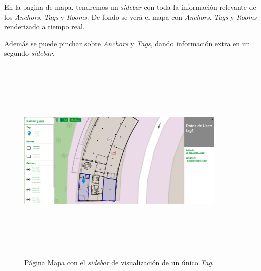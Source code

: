 En la pagina de mapa, tendremos un \textit{sidebar} con toda la información relevante de los \textit{Anchors}, \textit{Tags} y \textit{Rooms}. De fondo se verá el mapa con \textit{Anchors}, \textit{Tags} y \textit{Rooms} renderizado a tiempo real.

Además se puede pinchar sobre \textit{Anchors} y \textit{Tags}, dando información extra en un segundo \textit{sidebar}.
\FloatBarrier
\begin{figure}[h]
    \centering
    \includegraphics[width=10cm,height=10cm,keepaspectratio]{img/tagsidebar.png}
    \caption{Página Mapa con el \textit{sidebar} de visualización de un único \textit{Tag}.}
    \label{fig:diagram_seceunce_guide}
\end{figure}
\FloatBarrier

